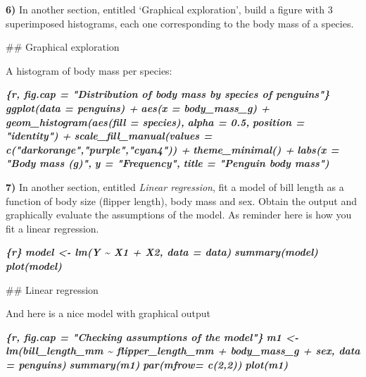 \documentclass[
  12pt,
]{book}
\newenvironment{Shaded}{\begin{snugshade}}{\end{snugshade}}
\newcommand{\FunctionTok}[1]{\textcolor[rgb]{0.00,0.00,0.00}{#1}}
\newcommand{\InformationTok}[1]{\textcolor[rgb]{0.56,0.35,0.01}{\textbf{\textit{#1}}}}
\newcommand{\NormalTok}[1]{#1}
\begin{document}
\textbf{6)} In another section, entitled `Graphical exploration', build a figure with 3 superimposed histograms, each one corresponding to the body mass of a species.

\begin{Shaded}
\begin{Highlighting}[]
\FunctionTok{\#\# Graphical exploration}

\NormalTok{A histogram of body mass per species:}

\InformationTok{\textasciigrave{}\textasciigrave{}\textasciigrave{}\{r, fig.cap = "Distribution of body mass by species of penguins"\}}
\InformationTok{  ggplot(data = penguins) +}
\InformationTok{  aes(x = body\_mass\_g) +}
\InformationTok{  geom\_histogram(aes(fill = species),}
\InformationTok{                 alpha = 0.5,}
\InformationTok{                 position = "identity") +}
\InformationTok{  scale\_fill\_manual(values = c("darkorange","purple","cyan4")) +}
\InformationTok{  theme\_minimal() +}
\InformationTok{  labs(x = "Body mass (g)",}
\InformationTok{       y = "Frequency",}
\InformationTok{       title = "Penguin body mass")}
\InformationTok{\textasciigrave{}\textasciigrave{}\textasciigrave{}}
\end{Highlighting}
\end{Shaded}

\textbf{7)} In another section, entitled \emph{Linear regression}, fit a model of bill length as a function of body size (flipper length), body mass and sex. Obtain the output and graphically evaluate the assumptions of the model. As reminder here is how you fit a linear regression.

\begin{Shaded}
\begin{Highlighting}[]
\InformationTok{\textasciigrave{}\textasciigrave{}\textasciigrave{}\{r\}}
\InformationTok{model \textless{}{-} lm(Y \textasciitilde{}  X1 + X2, data = data)}
\InformationTok{summary(model)}
\InformationTok{plot(model)}
\InformationTok{\textasciigrave{}\textasciigrave{}\textasciigrave{}}
\end{Highlighting}
\end{Shaded}

\begin{Shaded}
\begin{Highlighting}[]
\FunctionTok{\#\# Linear regression}

\NormalTok{And here is a nice model with graphical output}

\InformationTok{\textasciigrave{}\textasciigrave{}\textasciigrave{}\{r, fig.cap = "Checking assumptions of the model"\}}
\InformationTok{m1 \textless{}{-} lm(bill\_length\_mm \textasciitilde{}  flipper\_length\_mm + body\_mass\_g + sex, data = penguins)}
\InformationTok{summary(m1)}
\InformationTok{par(mfrow= c(2,2))}
\InformationTok{plot(m1)}
\InformationTok{\textasciigrave{}\textasciigrave{}\textasciigrave{}}
\end{Highlighting}
\end{Shaded}
\end{document}
